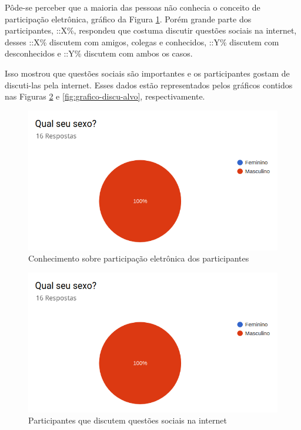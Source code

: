 \par
Pôde-se perceber que a maioria das pessoas não conhecia o conceito de participação eletrônica, gráfico da Figura \ref{fig:grafico-participacao}. Porém grande parte dos participantes,
::X\%, respondeu que costuma discutir questões sociais na internet, desses ::X\% discutem com amigos, colegas e conhecidos, ::Y\% discutem com desconhecidos
e ::Y\% discutem com ambos os casos.

\par
Isso mostrou que questões sociais são importantes e os participantes gostam de discuti-las pela internet.
Esses dados estão representados pelos gráficos contidos nas Figuras \ref{fig:grafico-discu} e  \ref{fig:grafico-discu-alvo}, respectivamente. 

\begin{figure}[!ht]
    \centering
    \includegraphics[scale=0.3]{./figuras/grafico_placeholder.png}
    \caption{Conhecimento sobre participação eletrônica dos participantes}
    \label{fig:grafico-participacao}
\end{figure}

\begin{figure}[!ht]
    \centering
    \includegraphics[scale=0.3]{./figuras/grafico_placeholder.png}
    \caption{Participantes que discutem questões sociais na internet}
    \label{fig:grafico-discu}
\end{figure}

